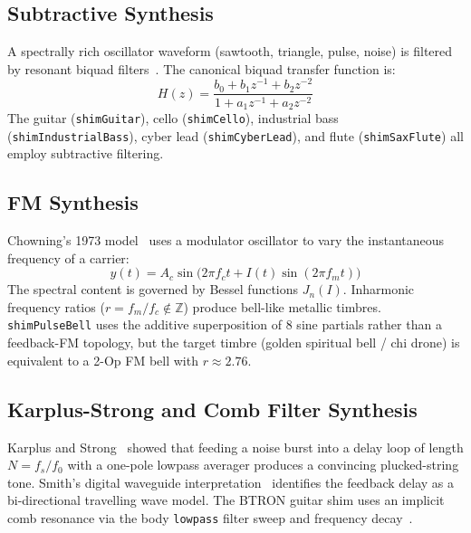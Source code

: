 \documentclass[10pt,journal,compsoc,twocolumn]{article}
\begin{document}
\subsection{Subtractive Synthesis}

A spectrally rich oscillator waveform (sawtooth, triangle, pulse, noise) is
filtered by resonant biquad filters~\cite{webaudio2021spec}.  The canonical
biquad transfer function is:
\begin{equation}
H(z) = \frac{b_0 + b_1 z^{-1} + b_2 z^{-2}}
             {1  + a_1 z^{-1} + a_2 z^{-2}}
\label{eq:biquad}
\end{equation}
The guitar (\texttt{shimGuitar}), cello (\texttt{shimCello}), industrial bass
(\texttt{shimIndustrialBass}), cyber lead (\texttt{shimCyberLead}), and
flute (\texttt{shimSaxFlute}) all employ subtractive filtering.

\subsection{FM Synthesis}

Chowning's 1973 model~\cite{chowning1973synthesis} uses a modulator oscillator
to vary the instantaneous frequency of a carrier:
\begin{equation}
y(t) = A_c \sin\!\bigl(2\pi f_c t + I(t)\sin(2\pi f_m t)\bigr)
\label{eq:fm}
\end{equation}
The spectral content is governed by Bessel functions $J_n(I)$.  Inharmonic
frequency ratios ($r = f_m/f_c \notin \mathbb{Z}$) produce bell-like metallic
timbres.  \texttt{shimPulseBell} uses the additive superposition of 8 sine
partials rather than a feedback-FM topology, but the target timbre (golden
spiritual bell / chi drone) is equivalent to a 2-Op FM bell with
$r \approx 2.76$.

\subsection{Karplus-Strong and Comb Filter Synthesis}

Karplus and Strong~\cite{karplus1983digital} showed that feeding a noise burst
into a delay loop of length $N = f_s/f_0$ with a one-pole lowpass averager
produces a convincing plucked-string tone.  Smith's digital waveguide
interpretation~\cite{smith1992physical} identifies the feedback delay as a
bi-directional travelling wave model.  The BTRON guitar shim uses an implicit
comb resonance via the body \texttt{lowpass} filter sweep and frequency
decay~\cite{karplus1983digital}.
\end{document}
